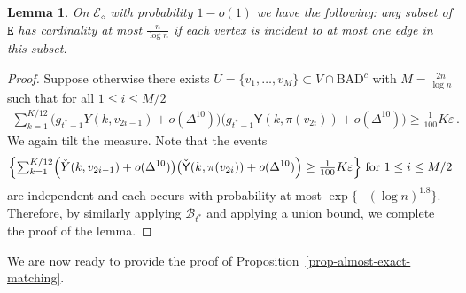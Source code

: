 \documentclass[11pt]{article}
\newtheorem{Lemma}[Theorem]{Lemma}
\numberwithin{equation}{section}
\begin{document}
\begin{Lemma}\label{lem-bad-matching}
On $\mathcal E_\diamond$ with probability $1-o(1)$ we have the following: any subset of $\mathtt E$ has cardinality at most $\frac{n}{\log n}$ if each vertex is incident to at most one edge in this subset.
\end{Lemma}
\begin{proof}
Suppose otherwise there exists $U = \{ v_1, \ldots, v_M  \} \subset V \cap \mathrm{BAD}^{c} $  with $M=\frac{2n}{\log n}$ such that for all $1\leq i \leq M/2$
\begin{align}
    \mbox{$\sum_{k=1}^{K/12}$} \big( g_{t^*-1} Y(k,v_{2i-1}) + o(\Delta^{10}) \big) \big(  g_{t^*-1} \mathsf{Y}(k,\pi(v_{2i})) + o(\Delta^{10}) \big) \geq \tfrac{1}{100} K \varepsilon \,.
    \label{equ-event-edge-matching}
\end{align}
We again tilt the measure. Note that the events 
\begin{align*}
    \Big\{  \mbox{$\sum_{k=1}^{K/12}$} \Big( \Check{Y}(k,v_{2i-1}) + o(\Delta^{10}) \big) \big( \Check{\mathsf{Y}} (k,\pi(v_{2i}))  + o(\Delta^{10}) \Big) \geq \tfrac{1}{100} K \varepsilon \Big\} \mbox{ for } 1 \leq i \leq M/2
\end{align*}
are independent and each occurs with probability at most $\exp \{ - (\log n)^{1.8} \}$. Therefore, by similarly applying $\mathcal B_{t^*}$ and applying a union bound, we complete the proof of the lemma.
\end{proof}
We are now ready to provide the proof of  Proposition~\ref{prop-almost-exact-matching}.
\end{document}
